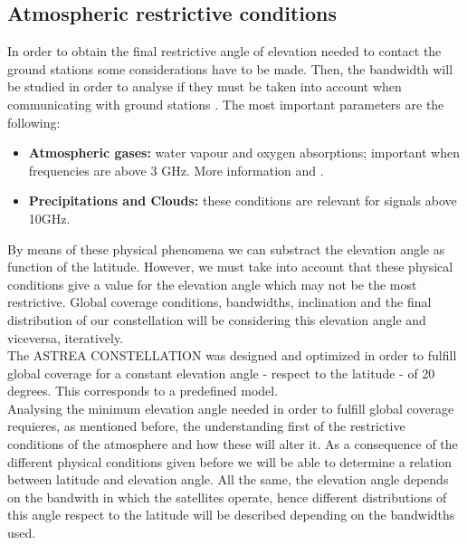 \subsection{Atmospheric restrictive conditions}
In order to obtain the final restrictive angle of elevation needed to contact the ground stations some considerations have to be made. Then, the bandwidth will be studied in order to analyse if they must be taken into account when communicating with ground stations \cite{Gomez2013}. The most important parameters are the following:


\begin{itemize}



\item\textbf{ Atmospheric gases: }water vapour and oxygen absorptions; important when frequencies are above 3 GHz. More information \cite{Zubair2011} and \cite{Luini2015}.\\

\item\textbf{ Precipitations and Clouds: }these conditions are relevant for signals above 10GHz. \\


\end{itemize}


By means of these physical phenomena we can substract the elevation angle as function of the latitude. However, we must take into account that these physical conditions give a value for the elevation angle which may not be the most restrictive. Global coverage conditions, bandwidths, inclination and the final distribution of our constellation will be considering this elevation angle and viceversa, iteratively. \\

The ASTREA CONSTELLATION was designed and optimized in order to fulfill global coverage for a constant elevation angle - respect to the latitude - of 20 degrees. This corresponds to a predefined model. \\



Analysing the minimum elevation angle needed in order to fulfill global coverage requieres, as mentioned before, the understanding first of the restrictive conditions of the atmosphere and how these will alter it. As a consequence of the different physical conditions given before we will be able to determine a relation between latitude and elevation angle. All the same, the elevation angle depends on the bandwith in which the satellites operate, hence different distributions of this angle respect to the latitude will be described depending on the bandwidths used. 

